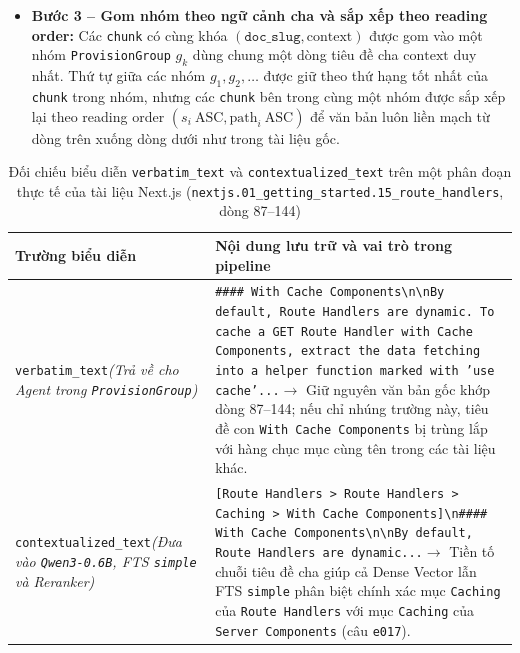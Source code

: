 \begin{itemize}
    \item \textbf{Bước 3 -- Gom nhóm theo ngữ cảnh cha và sắp xếp theo reading order:} Các \texttt{chunk} có cùng khóa $(\texttt{doc\_slug}, \text{context})$ được gom vào một nhóm \texttt{ProvisionGroup} $g_k$ dùng chung một dòng tiêu đề cha $\text{context}$ duy nhất. Thứ tự giữa các nhóm $g_1, g_2, \dots$ được giữ theo thứ hạng tốt nhất của \texttt{chunk} trong nhóm, nhưng các \texttt{chunk} bên trong cùng một nhóm được sắp xếp lại theo reading order $(s_i\ \text{ASC}, \text{path}_i\ \text{ASC})$ để văn bản luôn liền mạch từ dòng trên xuống dòng dưới như trong tài liệu gốc.
\end{itemize}

\begin{table}[H]
\centering
\caption{Đối chiếu biểu diễn \texttt{verbatim\_text} và \texttt{contextualized\_text} trên một phân đoạn thực tế của tài liệu Next.js (\texttt{nextjs.01\_getting\_started.15\_route\_handlers}, dòng 87--144)}
\label{tab:ctx_vs_verb}
\footnotesize\setlength{\tabcolsep}{4.5pt}\begin{tabularx}{\textwidth}{>{\raggedright\arraybackslash}p{3.6cm}>{\raggedright\arraybackslash}X}
\toprule
\textbf{Trường biểu diễn} & \textbf{Nội dung lưu trữ và vai trò trong pipeline} \\
\midrule
\texttt{verbatim\_text}\newline\textit{(Trả về cho Agent trong \texttt{ProvisionGroup})} & \texttt{\#\#\#\# With Cache Components\textbackslash n\textbackslash nBy default, Route Handlers are dynamic. To cache a GET Route Handler with Cache Components, extract the data fetching into a helper function marked with 'use cache'...}\newline$\rightarrow$ Giữ nguyên văn bản gốc khớp dòng 87--144; nếu chỉ nhúng trường này, tiêu đề con \texttt{With Cache Components} bị trùng lắp với hàng chục mục cùng tên trong các tài liệu khác. \\
\addlinespace[3pt]
\texttt{contextualized\_text}\newline\textit{(Đưa vào \texttt{Qwen3-0.6B}, FTS \texttt{simple} và Reranker)} & \texttt{[Route Handlers > Route Handlers > Caching > With Cache Components]\textbackslash n\#\#\#\# With Cache Components\textbackslash n\textbackslash nBy default, Route Handlers are dynamic...}\newline$\rightarrow$ Tiền tố chuỗi tiêu đề cha giúp cả Dense Vector lẫn FTS \texttt{simple} phân biệt chính xác mục \texttt{Caching} của \texttt{Route Handlers} với mục \texttt{Caching} của \texttt{Server Components} (câu \texttt{e017}). \\
\bottomrule
\end{tabularx}
\end{table}

